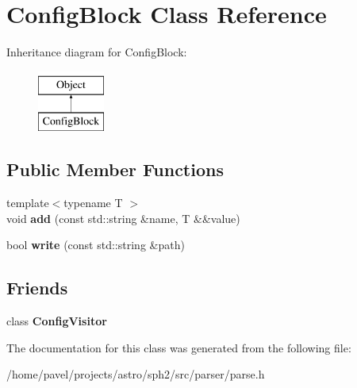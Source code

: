 \hypertarget{classConfigBlock}{}\section{Config\+Block Class Reference}
\label{classConfigBlock}
Inheritance diagram for Config\+Block\+:\begin{figure}[H]
\begin{center}
\leavevmode
\includegraphics[height=2.000000cm]{classConfigBlock}
\end{center}
\end{figure}
\subsection*{Public Member Functions}
\begin{DoxyCompactItemize}
\item 
\hypertarget{classConfigBlock_a0acf7d5147a4a7ae965aca6da6c351ee}{}\label{classConfigBlock_a0acf7d5147a4a7ae965aca6da6c351ee} 
{\footnotesize template$<$typename T $>$ }\\void {\bfseries add} (const std\+::string \&name, T \&\&value)
\item 
\hypertarget{classConfigBlock_a3b26fa398f831adee695d71f8095ed26}{}\label{classConfigBlock_a3b26fa398f831adee695d71f8095ed26} 
bool {\bfseries write} (const std\+::string \&path)
\end{DoxyCompactItemize}
\subsection*{Friends}
\begin{DoxyCompactItemize}
\item 
\hypertarget{classConfigBlock_a4d53249f3dd66a65e783fc86bcebdfd3}{}\label{classConfigBlock_a4d53249f3dd66a65e783fc86bcebdfd3} 
class {\bfseries Config\+Visitor}
\end{DoxyCompactItemize}


The documentation for this class was generated from the following file\+:\begin{DoxyCompactItemize}
\item 
/home/pavel/projects/astro/sph2/src/parser/parse.\+h\end{DoxyCompactItemize}
